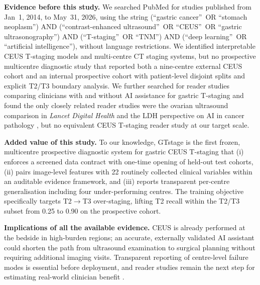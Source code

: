 \documentclass[11pt,a4paper]{article}
\begin{document}
\begin{tcolorbox}[colback=blue!3!white,colframe=blue!40!black,title={Research in context},breakable]
\textbf{Evidence before this study.} We searched PubMed for studies published from Jan~1, 2014, to May~31, 2026, using the string (\textquotedblleft gastric cancer\textquotedblright\ OR \textquotedblleft stomach neoplasm\textquotedblright) AND (\textquotedblleft contrast-enhanced ultrasound\textquotedblright\ OR \textquotedblleft CEUS\textquotedblright\ OR \textquotedblleft gastric ultrasonography\textquotedblright) AND (\textquotedblleft T-staging\textquotedblright\ OR \textquotedblleft TNM\textquotedblright) AND (\textquotedblleft deep learning\textquotedblright\ OR \textquotedblleft artificial intelligence\textquotedblright), without language restrictions. We identified interpretable CEUS T-staging models and multi-centre CT staging systems, but no prospective multicentre diagnostic study that reported both a nine-centre external CEUS cohort and an internal prospective cohort with patient-level disjoint splits and explicit T2/T3 boundary analysis. We further searched for reader studies comparing clinicians with and without AI assistance for gastric T-staging and found the only closely related reader studies were the ovarian ultrasound comparison in \emph{Lancet Digital Health} \cite{gao2022ovarian} and the LDH perspective on AI in cancer pathology \cite{sounderajah2022aipath}, but no equivalent CEUS T-staging reader study at our target scale.

\textbf{Added value of this study.} To our knowledge, GTstage is the first frozen, multicentre prospective diagnostic system for gastric CEUS T-staging that (i) enforces a screened data contract with one-time opening of held-out test cohorts, (ii) pairs image-level features with 22 routinely collected clinical variables within an auditable evidence framework, and (iii) reports transparent per-centre generalisation including four under-performing centres. The training objective specifically targets T2$\to$T3 over-staging, lifting T2 recall within the T2/T3 subset from 0.25 to 0.90 on the prospective cohort.

\textbf{Implications of all the available evidence.} CEUS is already performed at the bedside in high-burden regions; an accurate, externally validated AI assistant could shorten the path from ultrasound examination to surgical planning without requiring additional imaging visits. Transparent reporting of centre-level failure modes is essential before deployment, and reader studies remain the next step for estimating real-world clinician benefit \cite{liu2019dl, gao2022ovarian}.
\end{tcolorbox}
\end{document}
